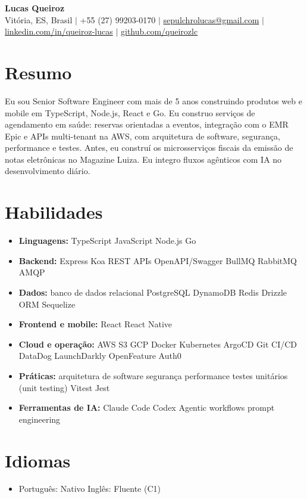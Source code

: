 \documentclass[letterpaper,10pt]{article}
\newcommand{\resumeItem}[1]{\item\small{#1}}
\newcommand{\resumeSubHeadingList}{\begin{itemize}[leftmargin=0.15in, label={}, nosep]}
\newcommand{\resumeSubHeadingListEnd}{\end{itemize}}
\begin{document}
\begin{center}
  \textbf{\Huge Lucas Queiroz} \\[3pt]
  \small Vit\'oria, ES, Brasil $|$ +55 (27) 99203-0170 $|$ \href{mailto:sepulchrolucas@gmail.com}{sepulchrolucas@gmail.com} $|$
  \href{https://linkedin.com/in/queiroz-lucas}{linkedin.com/in/queiroz-lucas} $|$
  \href{https://github.com/queirozlc}{github.com/queirozlc}
\end{center}
\vspace{1pt}

\section{Resumo}
Eu sou Senior Software Engineer com mais de 5 anos construindo produtos web e mobile em TypeScript, Node.js, React e Go. Eu construo servi\c{c}os de agendamento em sa\'ude: reservas orientadas a eventos, integra\c{c}\~ao com o EMR Epic e APIs multi-tenant na AWS, com arquitetura de software, seguran\c{c}a, performance e testes. Antes, eu constru\'i os microsservi\c{c}os fiscais da emiss\~ao de notas eletr\^onicas no Magazine Luiza. Eu integro fluxos ag\^enticos com IA no desenvolvimento di\'ario.

\section{Habilidades}
\resumeSubHeadingList
\resumeItem{\textbf{Linguagens:} TypeScript \textbar{} JavaScript \textbar{} Node.js \textbar{} Go}
\resumeItem{\textbf{Backend:} Express \textbar{} Koa \textbar{} REST APIs \textbar{} OpenAPI/Swagger \textbar{} BullMQ \textbar{} RabbitMQ \textbar{} AMQP}
\resumeItem{\textbf{Dados:} banco de dados relacional \textbar{} PostgreSQL \textbar{} DynamoDB \textbar{} Redis \textbar{} Drizzle ORM \textbar{} Sequelize}
\resumeItem{\textbf{Frontend e mobile:} React \textbar{} React Native}
\resumeItem{\textbf{Cloud e opera\c{c}\~ao:} AWS \textbar{} S3 \textbar{} GCP \textbar{} Docker \textbar{} Kubernetes \textbar{} ArgoCD \textbar{} Git \textbar{} CI/CD \textbar{} DataDog \textbar{} LaunchDarkly \textbar{} OpenFeature \textbar{} Auth0}
\resumeItem{\textbf{Pr\'aticas:} arquitetura de software \textbar{} seguran\c{c}a \textbar{} performance \textbar{} testes unit\'arios (unit testing) \textbar{} Vitest \textbar{} Jest}
\resumeItem{\textbf{Ferramentas de IA:} Claude Code \textbar{} Codex \textbar{} Agentic workflows \textbar{} prompt engineering}\resumeSubHeadingListEnd

\section{Idiomas}
\resumeSubHeadingList
\resumeItem{Portugu\^es: Nativo \textbar{} Ingl\^es: Fluente (C1)}
\resumeSubHeadingListEnd
\end{document}
